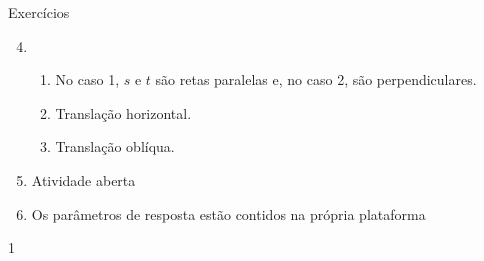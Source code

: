 \begin{answer}{Exercícios}
{\exerciselist
\begin{enumerate}\setcounter{enumi}{3}
\item 
\begin{enumerate}
\item No caso 1, $s$ e $t$ são retas paralelas e, no caso 2, são perpendiculares.
\item Translação horizontal.
\item Translação oblíqua.
\end{enumerate}

\item Atividade aberta

\item Os parâmetros de resposta estão contidos na própria plataforma
\end{enumerate}
}{1}
\end{answer}

\exercise
{}\label{transformacoes-exercise3}

